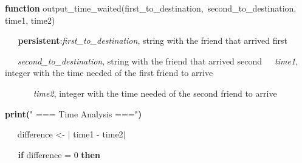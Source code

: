 \documentclass[12pt]{article}
\begin{document}
\vspace{\baselineskip}\begin{justify}
{\fontsize{8pt}{9.6pt}\selectfont \textbf{ \tabto{0.75in} function }output\_time\_waited(first\_to\_destination,\ second\_to\_destination,  time1, time2) \par}
\end{justify}\par

\begin{justify}
{\fontsize{8pt}{9.6pt}\selectfont \textbf{\ \   \tabto{0.75in} \tab persistent}:\textit{first\_to\_destination}, string with the friend that arrived first \par}
\end{justify}\par

\begin{justify}
{\fontsize{8pt}{9.6pt}\selectfont  \tabto{0.75in} \tab \tab \ \ \  \textit{second\_to\_destination}, string with the friend that arrived second\tab \tab \tab \tab \ \ \  \textit{time1}, integer with the time needed of the first friend to arrive\par}
\end{justify}\par

\begin{justify}
{\fontsize{8pt}{9.6pt}\selectfont \ \ \   \tabto{0.75in} \tab \tab \ \ \  \textit{time2}, integer with the time needed of the second friend to arrive\tab \par}
\end{justify}\par

\begin{justify}
{\fontsize{8pt}{9.6pt}\selectfont \textbf{ \tabto{0.75in}  \tab print(}" === Time Analysis ==="\textbf{)}\par}
\end{justify}\par

\begin{justify}
{\fontsize{8pt}{9.6pt}\selectfont \textbf{\ \   \tabto{0.75in}  }\tab difference <- $ \vert $ time1 - time2$ \vert $ \par}
\end{justify}\par

\begin{justify}
{\fontsize{8pt}{9.6pt}\selectfont \textbf{\ \   \tabto{0.75in}  \tab if }difference = 0 \textbf{then}\par}
\end{justify}\par
\end{document}
